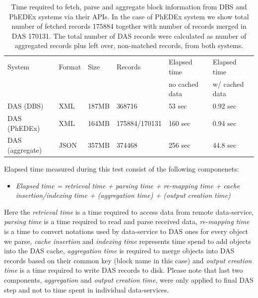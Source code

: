 \documentclass[a4paper]{jpconf}
\begin{document}
\begin{table}[hbt]
\centering
\begin{tabular}{llllll}\hline
\hline

System & Format & Size & Records & Elapsed time & Elapsed time \\
& & & & no cached data & w/ cached data \\
\hline
DAS (DBS) & XML & 187MB & 368716 & 53 sec & 0.92 sec \\
DAS (PhEDEx) & XML & 164MB & 175884/170131 & 160 sec & 0.94 sec \\
DAS (aggregate) & JSON & 357MB & 374468 & 256 sec & 44.8 sec \\
\hline
\hline
\end{tabular}
\caption{Time required to fetch, parse and aggregate block information
from DBS and PhEDEx systems via their APIs. In the case of PhEDEx
system we show total number of fetched records 175884 together with
number of records merged in DAS 170131. The total number of DAS records 
were calculated as number of aggregated records plus left over, non-matched records,
from both systems.}
\label{DAS_benchmark}
\end{table}

Elapsed time measured during this test consist of the following componenets:
\begin{itemize}
\item[]
{\it
Elapsed time = retrieval time + parsing time + re-mapping time 
        + cache insertion/indexing time 
        + (aggregation time) + (output creation time)
}
\end{itemize}
Here the {\it retrieval time} is a time required to access data from remote data-service,
{\it parsing time} is a time required to read and parse received data, {\it re-mapping time}
is a time to convert notations used by data-service to DAS ones for every object
we parse, {\it cache insertion} and {\it indexing time} represents time spend to add objects into
the DAS cache, {\it aggregation time} is required to merge objects into DAS records based
on their common key (block name in this case) and {\it output creation time}
is a time required to write DAS records to disk. Please note that last two
components, {\it aggregation} and {\it output creation time}, were only applied to
final DAS step and not to time spent in individual data-services.

%
\end{document}
